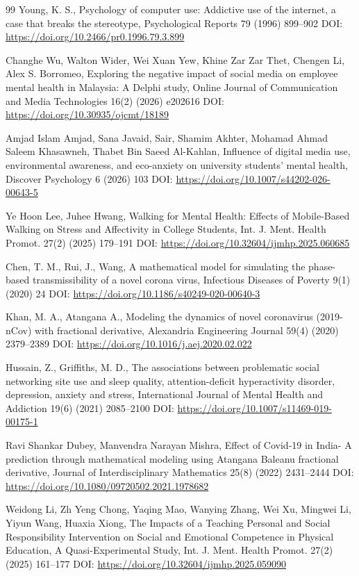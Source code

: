 \documentclass[10pt]{NSP1}
\begin{document}
\begin{thebibliography}{99}
Young, K. S., Psychology of computer use: Addictive use of the internet, a case that breaks the stereotype, Psychological Reports 79 (1996) 899--902 DOI: \url{https://doi.org/10.2466/pr0.1996.79.3.899}

Changhe Wu, Walton Wider, Wei Xuan Yew, Khine Zar Zar Thet, Chengen Li, Alex S. Borromeo, Exploring the negative impact of social media on employee mental health in Malaysia: A Delphi study, Online Journal of Communication and Media Technologies 16(2) (2026) e202616 DOI: \url{https://doi.org/10.30935/ojcmt/18189}

Amjad Islam Amjad, Sana Javaid, Sair, Shamim Akhter, Mohamad Ahmad Saleem Khasawneh, Thabet Bin Saeed Al-Kahlan, Influence of digital media use, environmental awareness, and eco-anxiety on university students' mental health, Discover Psychology 6 (2026) 103 DOI: \url{https://doi.org/10.1007/s44202-026-00643-5}

Ye Hoon Lee, Juhee Hwang, Walking for Mental Health: Effects of Mobile-Based Walking on Stress and Affectivity in College Students, Int. J. Ment. Health Promot. 27(2) (2025) 179--191 DOI: \url{https://doi.org/10.32604/ijmhp.2025.060685}

Chen, T. M., Rui, J., Wang, A mathematical model for simulating the phase-based transmissibility of a novel corona virus, Infectious Diseases of Poverty 9(1) (2020) 24 DOI: \url{https://doi.org/10.1186/s40249-020-00640-3}

Khan, M. A., Atangana A., Modeling the dynamics of novel coronavirus (2019-nCov) with fractional derivative, Alexandria Engineering Journal 59(4) (2020) 2379--2389 DOI: \url{https://doi.org/10.1016/j.aej.2020.02.022}

Hussain, Z., Griffiths, M. D., The associations between problematic social networking site use and sleep quality, attention-deficit hyperactivity disorder, depression, anxiety and stress, International Journal of Mental Health and Addiction 19(6) (2021) 2085--2100 DOI: \url{https://doi.org/10.1007/s11469-019-00175-1}

Ravi Shankar Dubey, Manvendra Narayan Mishra, Effect of Covid-19 in India- A prediction through mathematical modeling using Atangana Baleanu fractional derivative, Journal of Interdisciplinary Mathematics 25(8) (2022) 2431--2444 DOI: \url{https://doi.org/10.1080/09720502.2021.1978682}

Weidong Li, Zh Yeng Chong, Yaqing Mao, Wanying Zhang, Wei Xu, Mingwei Li, Yiyun Wang, Huaxia Xiong, The Impacts of a Teaching Personal and Social Responsibility Intervention on Social and Emotional Competence in Physical Education, A Quasi-Experimental Study, Int. J. Ment. Health Promot. 27(2) (2025) 161--177 DOI: \url{https://doi.org/10.32604/ijmhp.2025.059090}


\end{thebibliography}
\end{document}
